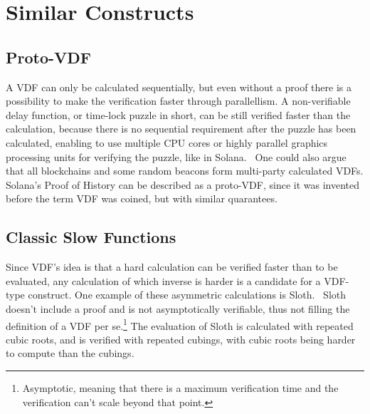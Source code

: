 \section{Similar Constructs}
\subsection{Proto-VDF}
A VDF can only be calculated sequentially, but even without a proof there is a possibility to make the verification faster through parallellism. A non-verifiable delay function, or time-lock puzzle in short, can be still verified faster than the calculation, because there is no sequential requirement after the puzzle has been calculated, enabling to use multiple CPU cores or highly parallel graphics processing units for verifying the puzzle, like in Solana.~\cite{Yakovenko2018-zn} One could also argue that all blockchains and some random beacons form multi-party calculated VDFs. Solana's Proof of History can be described as a proto-VDF, since it was invented before the term VDF was coined, but with similar quarantees.

\subsection{Classic Slow Functions}
Since VDF's idea is that a hard calculation can be verified faster than to be evaluated, any calculation of which inverse is harder is a candidate for a VDF-type construct. One example of these asymmetric calculations is Sloth.~\cite{Boneh2018} Sloth doesn't include a proof and is not asymptotically verifiable, thus not filling the definition of a VDF per se.\footnote{Asymptotic, meaning that there is a maximum verification time and the verification can't scale beyond that point.} The evaluation of Sloth is calculated with repeated cubic roots, and is verified with repeated cubings, with cubic roots being harder to compute than the cubings.

